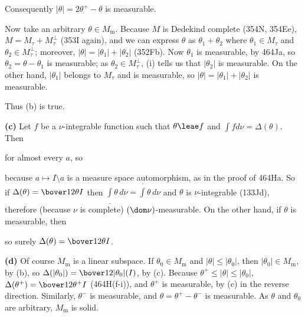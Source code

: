 {Consequently $|\theta|=2\theta^+-\theta$ is measurable.

\medskip

 Now take an arbitrary $\theta\in M_{\text{m}}$.
Because $M$ is Dedekind complete (354N, 354Ee),
$M=M_{\tau}+M_{\tau}^{\perp}$ (353I again), and we can express $\theta$ as
$\theta_1+\theta_2$ where $\theta_1\in M_{\tau}$ and
$\theta_2\in M_{\tau}^{\perp}$;
moreover, $|\theta|=|\theta_1|+|\theta_2|$ (352Fb).
Now $\theta_1$ is measurable, by 464Ja, so $\theta_2=\theta-\theta_1$ is
measurable;  as $\theta_2\in M_{\tau}^{\perp}$, (i) tells us
that $|\theta_2|$ is measurable.   On the other hand, $|\theta_1|$
belongs to $M_{\tau}$ and is measurable, so
$|\theta|=|\theta_1|+|\theta_2|$ is measurable.

Thus (b) is true.

\medskip

{\bf (c)} Let $f$ be a $\nu$-integrable function such that
$\theta\leae f$ and $\int fd\nu=\Delta(\theta)$.   Then


\noindent for almost every $a$, so


\noindent because $a\mapsto I\setminus a$ is a measure space
automorphism, as in the proof of 464Ha.   So if
$\Delta(\theta)=\bover12\theta I$ then
$\underline{\int}\theta\,d\nu=\overline{\int}\theta\,d\nu$ and $\theta$
is $\nu$-integrable (133Jd), therefore (because $\nu$ is complete)
$(\dom\nu)$-measurable.   On the other hand, if $\theta$ is measurable,
then


\noindent so surely $\Delta(\theta)=\bover12\theta I$.

\medskip

{\bf (d)} Of course $M_{\text{m}}$ is a linear subspace.   If
$\theta_0\in M_{\text{m}}$ and $|\theta|\le|\theta_0|$, then
$|\theta_0|\in M_{\text{m}}$, by (b), so
$\Delta(|\theta_0|)=\bover12|\theta_0|(I)$, by (c).   Because
$\theta^+\le|\theta|\le|\theta_0|$, $\Delta(\theta^+)=\bover12\theta^+I$
(464H(f-i)), and $\theta^+$ is measurable, by (c) in the reverse
direction.   Similarly, $\theta^-$ is measurable, and
$\theta=\theta^+-\theta^-$ is measurable.   As $\theta$ and $\theta_0$
are arbitrary, $M_{\text{m}}$ is solid.
}%

